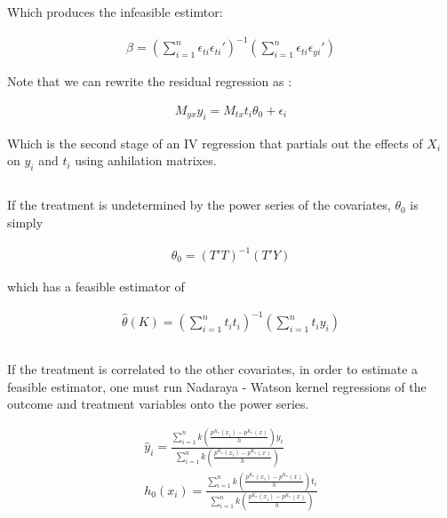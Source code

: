 \documentclass[12pt]{article}
\begin{document}
Which produces the infeasible estimtor:

\begin{gather*}
\beta = \left( \sum\limits_{i=1}^n \epsilon_{ti} \epsilon_{ti}' \right)^{-1} \left( \sum\limits_{i=1}^n \epsilon_{ti} \epsilon_{yi}' \right)
\end{gather*}

Note that we can rewrite the residual regression as :

\begin{gather*}
M_{yx} y_i = M_{tx} t_i \theta_0 + \epsilon_i
\end{gather*}

Which is the second stage of an IV regression that partials out the effects of $X_i$ on $y_i$ and $t_i$ using anhilation matrixes.

\subsection{}
\subsubsection{}

If the treatment is undetermined by the power series of the covariates, $\theta_0$ is simply

\begin{gather*}
\theta_0 = (T'T)^{-1}(T'Y)
\end{gather*}

which has a feasible estimator of

\begin{gather*}
\hat{\theta}(K) =(\sum\limits_{i=1}^{n} t_i t_i)^{-1}  (\sum\limits_{i=1}^{n} t_i y_i)\\
\end{gather*}



\subsubsection{}
If the treatment is correlated to the other covariates, in order to estimate a feasible estimator, one must run Nadaraya - Watson kernel regressions of the outcome and treatment variables onto the power series.

\begin{gather*}
\hat{y}_i = \frac{\sum\limits_{i=1}^{n} k\left(\frac{p^{K_n}(x_i) - p^{K_n}(x)}{h}\right) y_i}{\sum\limits_{i=1}^{n} k\left(\frac{p^{K_n}(x_i) - p^{K_n}(x)}{h}\right)} \\
h_0(x_i) = \frac{\sum\limits_{i=1}^{n} k\left(\frac{p^{K_n}(x_i) - p^{K_n}(x)}{h}\right) t_i}{\sum\limits_{i=1}^{n} k\left(\frac{p^{K_n}(x_i) - p^{K_n}(x)}{h}\right)}
\end{gather*}
\end{document}
